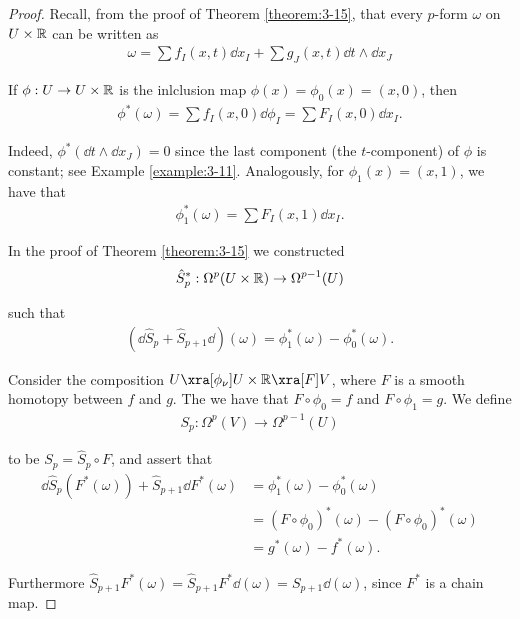 \begin{proof}
Recall, from the proof of Theorem \ref{theorem:3-15}, that every $p$-form $\omega$ on $U\times\mathbb{R}$
can be written as
\begin{align*}
  \omega = \sum f_I(x, t)\dd x_I + \sum g_J(x, t)\dd t\wedge\dd x_J
\end{align*}

If $\phi:U\to U\times\mathbb{R}$ is the inlclusion map $\phi(x) = \phi_0(x) = (x, 0)$, then 
\begin{align*}
  \phi^*(\omega) = \sum f_I(x, 0)\dd \phi_I = \sum F_I(x, 0)\dd x_I.
\end{align*}

Indeed, $\phi^*(\dd t\wedge\dd x_J) = 0$ since the last component (the $t$-component) of $\phi$ is
constant; see Example \ref{example:3-11}. Analogously, for $\phi_1(x) = (x, 1)$, we have that
\begin{align*}
  \phi^*_1(\omega) = \sum F_I(x, 1)\dd x_I.
\end{align*}

In the proof of Theorem \ref{theorem:3-15} we constructed
\begin{align*}
  \hat{S}^*_p: \Omega^p(U\times\mathbb{R})\to \Omega^{p-1}(U)
\end{align*}

such that 
\begin{align}
  (\dd\hat{S}_p + \hat{S}_{p+1}\dd)(\omega) = \phi^*_1(\omega) - \phi^*_0(\omega).
\end{align}

Consider the composition $U\xra[\phi_\nu]U\times\RR\xra[F] V$, where $F$ is a smooth homotopy between 
$f$ and $g$. The we have that $F\circ\phi_0 = f$ and $F\circ\phi_1 = g$. We define 
\begin{align*}
  S_p:\Omega^p(V)\to \Omega^{p-1}(U)
\end{align*}

to be $S_p = \hat{S}_p\circ F$, and assert that 
\begin{align*}
  \dd\hat{S}_p(F^*(\omega)) + \hat{S}_{p+1}\dd F^*(\omega)
  & = \phi_1^*(\omega) - \phi_0^*(\omega) \\
  & = (F\circ\phi_0)^*(\omega) - (F\circ\phi_0)^*(\omega) \\
  & = g^*(\omega) - f^*(\omega).
\end{align*}

Furthermore $\hat{S}_{p+1}F^*(\omega) = \hat{S}_{p+1}F^*\dd(\omega) = S_{p+1}\dd(\omega)$, since 
$F^*$ is a chain map.
\end{proof}

